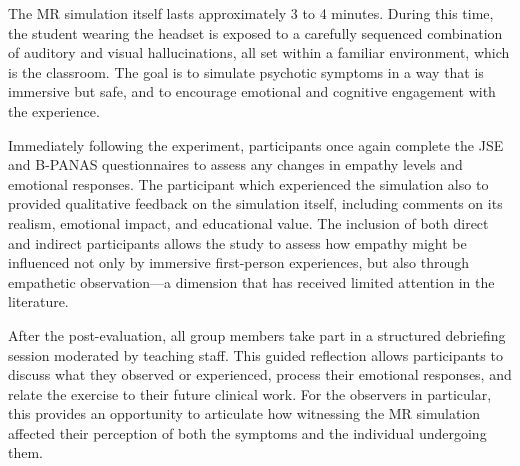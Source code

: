 The MR simulation itself lasts approximately 3 to 4 minutes. During this time, the student wearing the headset is exposed to a carefully sequenced combination of auditory and visual hallucinations, all set within a familiar environment, which is the classroom. The goal is to simulate psychotic symptoms in a way that is immersive but safe, and to encourage emotional and cognitive engagement with the experience.

\vspace{1em}

Immediately following the experiment, participants once again complete the JSE and B-PANAS questionnaires to assess any changes in empathy levels and emotional responses. The participant which experienced the simulation also to provided qualitative feedback on the simulation itself, including comments on its realism, emotional impact, and educational value. The inclusion of both direct and indirect participants allows the study to assess how empathy might be influenced not only by immersive first-person experiences, but also through empathetic observation—a dimension that has received limited attention in the literature.

\vspace{1em}

After the post-evaluation, all group members take part in a structured debriefing session moderated by teaching staff. This guided reflection allows participants to discuss what they observed or experienced, process their emotional responses, and relate the exercise to their future clinical work. For the observers in particular, this provides an opportunity to articulate how witnessing the MR simulation affected their perception of both the symptoms and the individual undergoing them.

